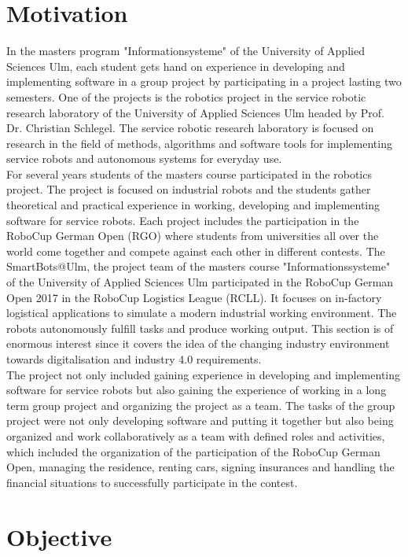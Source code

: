 \section{Motivation}

In the masters program "Informationsysteme" of the University of Applied Sciences Ulm, each student gets hand on experience in developing and implementing software in a group project by participating in a project lasting two semesters. One of the projects is the robotics project in the service robotic research laboratory of the University of Applied Sciences Ulm headed by Prof. Dr. Christian Schlegel. The service robotic research laboratory is focused on research in the field of methods, algorithms and software tools for implementing service robots and autonomous systems for everyday use. \\
For several years students of the masters course participated in the robotics project. The project is focused on industrial robots and the students gather theoretical and practical experience in working, developing and implementing software for service robots. Each project includes the participation in the RoboCup German Open (RGO) where students from universities all over the world come together and compete against each other in different contests. The SmartBots@Ulm, the project team of the masters course "Informationssysteme" of the University of Applied Sciences Ulm participated in the RoboCup German Open 2017 in the RoboCup Logistics League (RCLL). It focuses on in-factory logistical applications to simulate a modern industrial working environment. The robots autonomously fulfill tasks and produce working output. This section is of enormous interest since it covers the idea of the changing industry environment towards digitalisation and industry 4.0 requirements. \\
The project not only included gaining experience in developing and implementing software for service robots but also gaining the experience of working in a long term group project and organizing the project as a team. The tasks of the group project were not only developing software and putting it together but also being organized and work collaboratively as a team with defined roles and activities, which included the organization of the participation of the RoboCup German Open, managing the residence, renting cars, signing insurances and handling the financial situations to successfully participate in the contest. 

\section{Objective}


